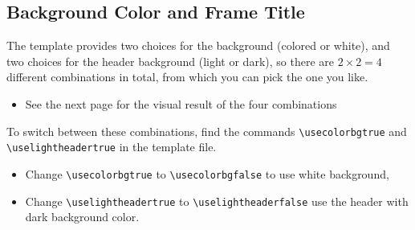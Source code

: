 \documentclass[12pt, aspectratio=169]{beamer}
\begin{document}
\subsection{Background Color and Frame Title}
\begin{frame}[fragile]{\insertsubsection}
The template provides two choices for the background (colored or white), and two choices for the header background (light or dark), so there are $2\times 2=4$ different combinations in total, from which you can pick the one you like.
\begin{itemize}
    \item See the next page for the visual result of the four combinations
\end{itemize}
To switch between these combinations, find the commands \verb|\usecolorbgtrue| and  \verb|\uselightheadertrue| in the template file.
\begin{itemize}
    \item Change \verb|\usecolorbgtrue| to \verb|\usecolorbgfalse| to use white background,
    \item Change \verb|\uselightheadertrue| to \verb|\uselightheaderfalse| use the header with dark background color.
\end{itemize}
\end{frame}
\end{document}
